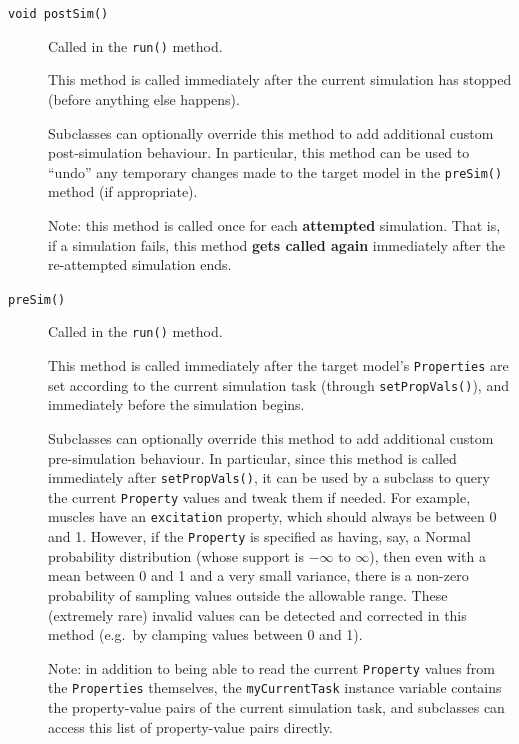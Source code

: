 \documentclass{article}
\begin{document}
\begin{description}
\item[{\tt void postSim()} ] \mbox{}

Called in the {\tt run()} method.

This method is called immediately after the current simulation has stopped (before anything else happens).

Subclasses can optionally override this method to add additional custom post-simulation behaviour. In particular, this method can be used to ``undo'' any temporary changes made to the target model in the {\tt preSim()} method (if appropriate).

\begin{sideblock}
Note: this method is called once for each \textbf{attempted} simulation. That is, if a simulation fails, this method \textbf{gets called again} immediately after the re-attempted simulation ends.
\end{sideblock}

\item[{\tt preSim()} ] \mbox{}

Called in the {\tt run()} method.

This method is called immediately after the target model's {\tt Properties} are set according to the current simulation task (through {\tt setPropVals()}), and immediately before the simulation begins.

Subclasses can optionally override this method to add additional custom pre-simulation behaviour. In particular, since this method is called immediately after {\tt setPropVals()}, it can be used by a subclass to query the current {\tt Property} values and tweak them if needed. For example, muscles have an {\tt excitation} property, which should always be between 0 and 1. However, if the {\tt Property} is specified as having, say, a Normal probability distribution (whose support is $-\infty$ to $\infty$), then even with a mean between 0 and 1 and a very small variance, there is a non-zero probability of sampling values outside the allowable range. These (extremely rare) invalid values can be detected and corrected in this method (e.g.\ by clamping values between 0 and 1).

\begin{sideblock}
Note: in addition to being able to read the current {\tt Property} values from the {\tt Properties} themselves, the {\tt myCurrentTask} instance variable contains the property-value pairs of the current simulation task, and subclasses can access this list of property-value pairs directly.
\end{sideblock}


\end{description}
\end{document}
